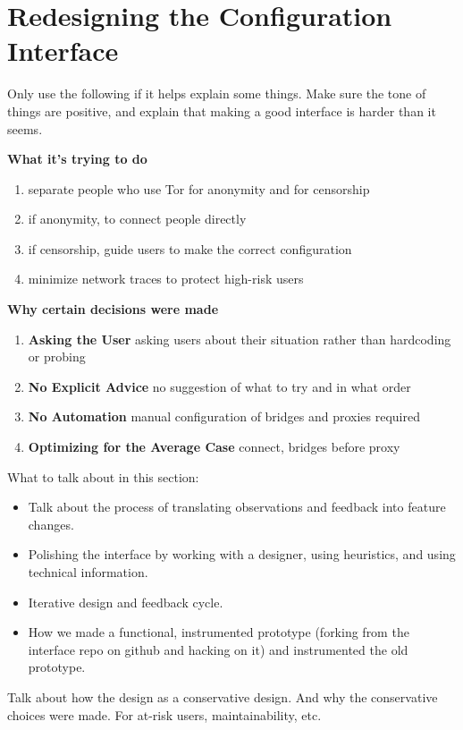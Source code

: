 \documentclass{template}
\begin{document}
\section{Redesigning the Configuration Interface}

{\color {red} 

Only use the following if it helps explain some things. Make sure the tone of things are positive, and explain that making a good interface is harder than it seems.

{\bfseries What it's trying to do}
\begin{enumerate} \itemsep1pt \parskip0pt 
    \item separate people who use Tor for anonymity and for censorship 
    \item if anonymity, to connect people directly
    \item if censorship, guide users to make the correct configuration
    \item minimize network traces to protect high-risk users
\end{enumerate}


{\bfseries Why certain decisions were made}
{\color {red} 
\begin{enumerate} \itemsep1pt \parskip0pt 
    \item {\bfseries Asking the User} asking users about their situation rather than hardcoding or probing
    \item {\bfseries No Explicit Advice} no suggestion of what to try and in what order
    \item {\bfseries No Automation} manual configuration of bridges and proxies required
    \item {\bfseries Optimizing for the Average Case} connect, bridges before proxy
\end{enumerate}
}

What to talk about in this section: 
\begin{itemize} \itemsep1pt \parskip0pt  
\item Talk about the process of translating observations and feedback into feature changes. 
\item Polishing the interface by working with a designer, using heuristics, and using technical information. 
\item Iterative design and feedback cycle. 
\item How we made a functional, instrumented prototype (forking from the interface repo on github and hacking on it) and instrumented the old prototype. 
\end{itemize} 

Talk about how the design as a conservative design. And why the conservative choices were made. For at-risk users, maintainability, etc.
}
\end{document}
